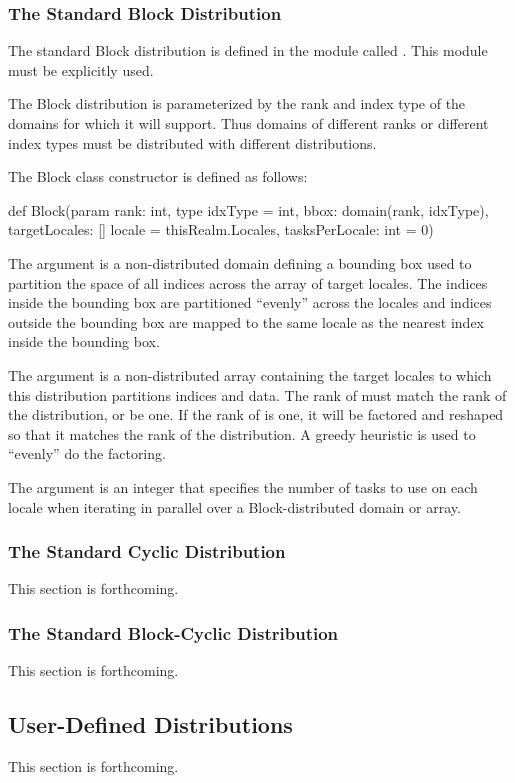 \subsubsection{The Standard Block Distribution}
\label{Block_Dist}

The standard Block distribution is defined in the module
called .  This module must be explicitly used.

The Block distribution is parameterized by the rank and index type of
the domains for which it will support.  Thus domains of different
ranks or different index types must be distributed with different
distributions.

The Block class constructor is defined as follows:
\begin{chapel}
def Block(param rank: int,
          type idxType = int,
          bbox: domain(rank, idxType),
          targetLocales: [] locale = thisRealm.Locales, 
          tasksPerLocale: int = 0)
\end{chapel}

The argument  is a non-distributed domain defining a
bounding box used to partition the space of all indices across the
array of target locales.  The indices inside the bounding box are
partitioned ``evenly'' across the locales and indices outside the
bounding box are mapped to the same locale as the nearest index inside
the bounding box.

The argument  is a non-distributed array
containing the target locales to which this distribution partitions
indices and data.  The rank of  must match the
rank of the distribution, or be one.  If the rank
of  is one, it will be factored and reshaped so
that it matches the rank of the distribution.  A greedy heuristic is
used to ``evenly'' do the factoring.

The argument  is an integer that specifies the
number of tasks to use on each locale when iterating in parallel over
a Block-distributed domain or array.

\subsubsection{The Standard Cyclic Distribution}
\label{Cyclic_Dist}

This section is forthcoming.

\subsubsection{The Standard Block-Cyclic Distribution}
\label{Block_Cyclic_Dist}

This section is forthcoming.

\subsection{User-Defined Distributions}
\label{User_Defined_Distributions}

This section is forthcoming.
